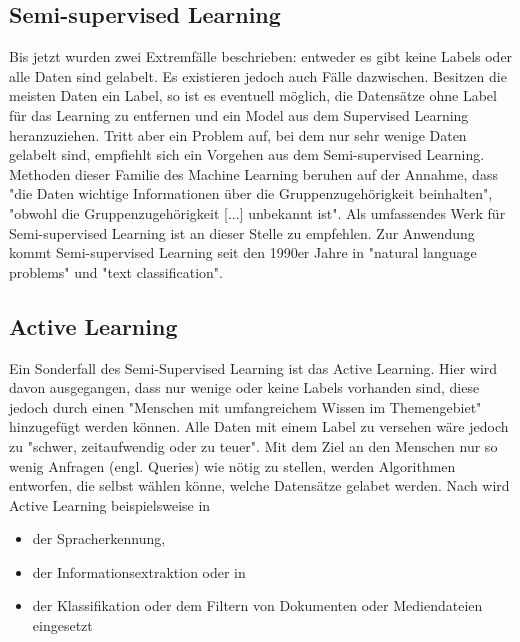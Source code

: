 \subsection{Semi-supervised Learning}
\newline
Bis jetzt wurden zwei Extremfälle beschrieben: entweder es gibt keine Labels oder alle Daten sind gelabelt. Es existieren jedoch auch Fälle dazwischen. Besitzen die meisten Daten ein Label, so ist es eventuell möglich, die Datensätze ohne Label für das Learning zu entfernen und ein Model aus dem Supervised Learning heranzuziehen. Tritt aber ein Problem auf, bei dem nur sehr wenige Daten gelabelt sind, empfiehlt sich ein Vorgehen aus dem Semi-supervised Learning. Methoden dieser Familie des Machine Learning beruhen auf der Annahme, dass "die Daten wichtige Informationen über die Gruppenzugehörigkeit beinhalten", "obwohl die Gruppenzugehörigkeit [...] unbekannt ist"\citep[S.~223; eigene Übersetzung]{ramasubramanian_machine_2017}. Als umfassendes Werk für Semi-supervised Learning ist an dieser Stelle \citep{chapelle_semi-supervised_2006} zu empfehlen. \newline
Zur Anwendung kommt Semi-supervised Learning seit den 1990er Jahre in "natural language problems" und "text classification"\citep[S.~4]{chapelle_semi-supervised_2006}.

\subsection{Active Learning}
Ein Sonderfall des Semi-Supervised Learning ist das Active Learning. Hier wird davon ausgegangen, dass nur wenige oder keine Labels vorhanden sind, diese jedoch durch einen "Menschen mit umfangreichem Wissen im Themengebiet"\citep[S.~i; eigene Übersetzung]{olsson_literature_2009} hinzugefügt werden können. Alle Daten mit einem Label zu versehen wäre jedoch zu "schwer, zeitaufwendig oder zu teuer"\citep[Abstract; eigene Übersetzung]{settles_active_2010}. Mit dem Ziel an den Menschen nur so wenig Anfragen (engl. Queries) wie nötig zu stellen\citep[Abstract]{olsson_literature_2009}, werden Algorithmen entworfen, die selbst wählen könne, welche Datensätze gelabet werden.\citep[Abstract]{settles_active_2010}\newline
Nach \citep[S.~4]{settles_active_2010} wird Active Learning beispielsweise in
\begin{itemize}
\item der Spracherkennung,
\item der Informationsextraktion oder in
\item der Klassifikation oder dem Filtern von Dokumenten oder Mediendateien eingesetzt
\end{itemize}

